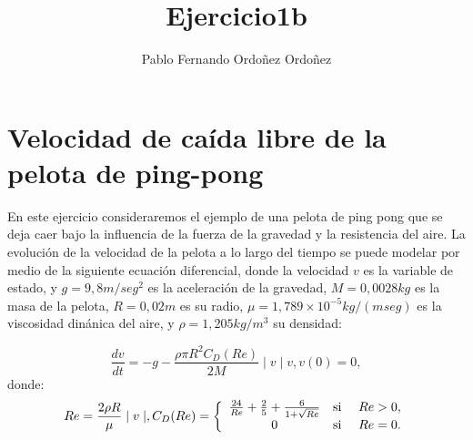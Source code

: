 \documentclass[12pt,a4paper]{article}
\title{Ejercicio1b}
\author{Pablo Fernando Ordoñez Ordoñez}
\begin{document}
\maketitle
\thispagestyle{fancy}

\section*{Velocidad de caída libre de la pelota de ping-pong}
En este ejercicio consideraremos el ejemplo de una pelota de ping pong que se deja caer bajo la influencia de la fuerza de la gravedad y la resistencia del aire.
La evolución de la velocidad de la pelota a lo largo del tiempo se puede modelar por medio de la siguiente ecuación diferencial, donde la velocidad $v$ es la variable de estado, y $g = 9,8m/seg^{2}$  es la aceleración de la gravedad, $M = 0,0028kg$ es la masa de la pelota, $R = 0,02m$ es su radio, $\mu = 1,789 \times 10^{-5} kg/(m seg)$ es la viscosidad dinánica del aire, y $\rho = 1,205 kg/m^{3}$ su densidad:

\begin{equation}
\frac{dv}{dt}=-g-\frac{\rho\pi R^{2}C_{D}(Re)}{2M}\mid v \mid v,    v(0)=0,
\end{equation}
donde:
\begin{align*}
Re = \frac{2\rho R}{\mu} \mid v \mid,  
C_{D}(Re) =
\left\lbrace
\begin{array}{ccc}
\frac{24}{Re}+\frac{2}{5}+\frac{6}{1+\sqrt{Re}} &\textup{si } &Re > 0, \\
0 &\textup{si } &Re = 0. 
\end{array}
\right.
\end{align*}
\end{document}
